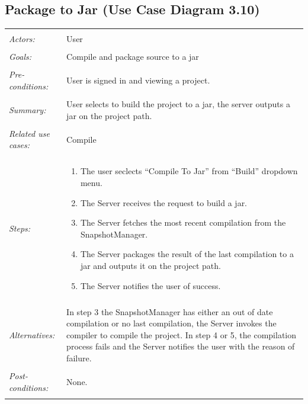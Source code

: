 \documentclass[11pt]{report}
\begin{document}
\subsection{Package to Jar (Use Case Diagram 3.10)}
\begin{tabular}{ p{2cm} p{12cm} }
     \hline
     \\
     \textit{Actors:} & User \\ 
     \\
     \textit{Goals:} & Compile and package source to a jar\\
     \\
     \textit{Pre-conditions:} & User is signed in and viewing a project. \\
     \\
     \textit{Summary:} & User selects to build the project to a jar, the server outputs a jar on the project path. \\
     \\
     \textit{Related use cases:} & Compile \\ 
     \\
     \textit{Steps:} & \begin{enumerate}
        \item The user seclects ``Compile To Jar'' from ``Build'' dropdown menu.
        \item The Server receives the request to build a jar.
        \item The Server fetches the most recent compilation from the SnapshotManager.
        \item The Server packages the result of the last compilation to a jar and outputs it on the project path.
        \item The Server notifies the user of success.
     \end{enumerate} \\
     \\
     \textit{Alternatives:} & In step 3 the SnapshotManager has either an out of date compilation or no last compilation, the Server invokes the compiler to compile the project. In step 4 or 5, the compilation process fails and the Server notifies the user with the reason of failure. \\
     \\
     \textit{Post-conditions:} & None. \\
     \\
    \hline
\end{tabular}
\end{document}
